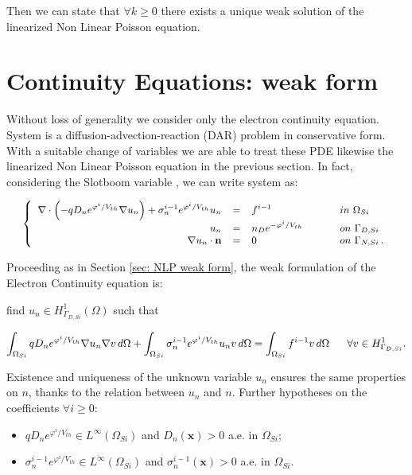 Then we can state that $\forall k \geq 0$ there exists a unique weak solution of the linearized Non Linear Poisson equation.

\section{Continuity Equations: weak form}
\label{sec: LEC weak}

Without loss of generality we consider only the electron continuity equation. System  is a diffusion-advection-reaction (DAR) problem in conservative form. With a suitable change of variables we are able to treat these PDE likewise the linearized Non Linear Poisson equation in the previous section. In fact, considering the Slotboom variable , we can write system  as:

\begin{equation}
\label{eq: system continuity equation}
\small
\left\{
\begin{array}{rcll}
 \nabla \cdot \left( - q D_n e^{\varphi^{i}/V_{th}}\nabla u_n \right) + \sigma_n^{i-1} e^{\varphi^{i}/V_{th}} u_n& = & f^{i-1}  & \psp{15} in \psp{2} \Omega_{Si} \\
u_n & = &  n_D e^{-\varphi^{i}/V_{th}} & \psp{15} on \psp{2} \Gamma_{D,Si} \\
\nabla u_n \cdot \vect{n} & = & 0 & \psp{15} on \psp{2} \Gamma_{N,Si} \, .
\end{array}
\right.
\end{equation}

Proceeding as in Section \ref{sec: NLP weak form}, the weak formulation of the Electron Continuity equation is: 

find $u_n \in H^1_{\Gamma_{D,Si}}(\Omega)$ such that

\begin{equation}
\footnotesize
\label{eq: LEC weakformulation}
\int_{\Omega_{Si}}  q D_n e^{\varphi^{i}/V_{th}} \nabla u_n \nabla v \, d\Omega + \int_{\Omega_{Si}} \sigma_n^{i-1} e^{\varphi^{i}/V_{th}} u_n v \, d\Omega = \int_{\Omega_{Si}} f^{i-1}v \, d\Omega \psp{10} \forall v \in H^1_{\Gamma_{D,Si}}.
\end{equation}


Existence and uniqueness of the unknown variable $u_n$ ensures the same properties on $n$, thanks to the relation  between $u_n$ and $n$.
Further hypotheses on the coefficients $\forall i\geq 0$:
\begin{itemize}
\item $q D_n e^{\varphi^{i}/V_{th}} \in L^{\infty}(\Omega_{Si})$ and $D_n(\mathbf{x})>0$ a.e. in $\Omega_{Si}$;
\item  $\sigma_n^{i-1} e^{\varphi^i/V_{th}} \in L^{\infty}(\Omega_{Si})$ and $\sigma_n^{i-1}(\mathbf{x})>0$ a.e. in $\Omega_{Si}$.
\end{itemize}


